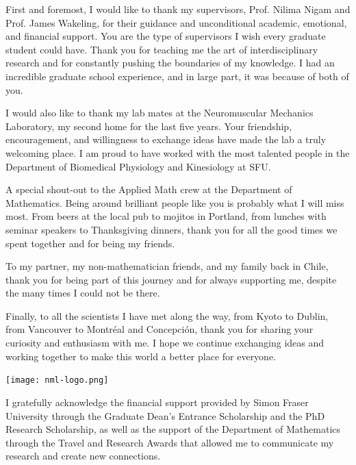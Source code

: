 \documentclass{sfuthesis}
\numberwithin{equation}{section}
\numberwithin{figure}{chapter}
\numberwithin{table}{chapter}
\theoremstyle{definition}
\begin{document}


\begin{acknowledgements}
First and foremost, I would like to thank my supervisors, Prof. Nilima Nigam and Prof. James Wakeling, for their guidance and unconditional academic, emotional, and financial support. You are the type of supervisors I wish every graduate student could have. Thank you for teaching me the art of interdisciplinary research and for constantly pushing the boundaries of my knowledge. I had an incredible graduate school experience, and in large part, it was because of both of you.

\medskip

I would also like to thank my lab mates at the Neuromuscular Mechanics Laboratory, my second home for the last five years. Your friendship, encouragement, and willingness to exchange ideas have made the lab a truly welcoming place. I am proud to have worked with the most talented people in the Department of Biomedical Physiology and Kinesiology at SFU.

\medskip

A special shout-out to the Applied Math crew at the Department of Mathematics. Being around brilliant people like you is probably what I will miss most. From beers at the local pub to mojitos in Portland, from lunches with seminar speakers to Thanksgiving dinners, thank you for all the good times we spent together and for being my friends.

\medskip

To my partner, my non-mathematician friends, and my family back in Chile, thank you for being part of this journey and for always supporting me, despite the many times I could not be there.

\medskip

Finally, to all the scientists I have met along the way, from Kyoto to Dublin, from Vancouver to Montr\'{e}al and Concepci\'{o}n, thank you for sharing your curiosity and enthusiasm with me. I hope we continue exchanging ideas and working together to make this world a better place for everyone.

\vfill

\begin{center}
    \texttt{[image: nml-logo.png]}
\end{center}

\noindent I gratefully acknowledge the financial support provided by Simon Fraser University through the Graduate Dean's Entrance Scholarship and the PhD Research Scholarship, as well as the support of the Department of Mathematics through the Travel and Research Awards that allowed me to communicate my research and create new connections.
\end{acknowledgements}
\end{document}
